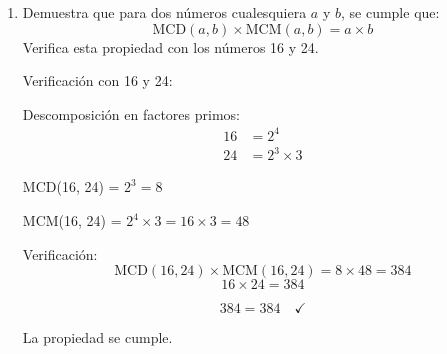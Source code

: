 \documentclass[12pt,a4paper]{article}
\begin{document}
\begin{enumerate}
Descomposición en factores primos:
\begin{align*}
120 &= 2^3 \times 3 \times 5 \\
180 &= 2^2 \times 3^2 \times 5 \\
240 &= 2^4 \times 3 \times 5
\end{align*}

MCD(120, 180, 240) = $2^2 \times 3 \times 5 = 4 \times 3 \times 5 = 60$ cm

Número de segmentos:
\begin{itemize}
    \item Del tubo de 120 cm: $120 \div 60 = 2$ segmentos
    \item Del tubo de 180 cm: $180 \div 60 = 3$ segmentos
    \item Del tubo de 240 cm: $240 \div 60 = 4$ segmentos
    \item Total: $2 + 3 + 4 = 9$ segmentos
\end{itemize}

Cada segmento debe medir  y se obtendrán  en total.
    
    \item Demuestra que para dos números cualesquiera $a$ y $b$, se cumple que: 
$$\text{MCD}(a,b) \times \text{MCM}(a,b) = a \times b$$
Verifica esta propiedad con los números 16 y 24.

Verificación con 16 y 24:

Descomposición en factores primos:
\begin{align*}
16 &= 2^4 \\
24 &= 2^3 \times 3
\end{align*}

MCD(16, 24) = $2^3 = 8$

MCM(16, 24) = $2^4 \times 3 = 16 \times 3 = 48$

Verificación:
$$\text{MCD}(16,24) \times \text{MCM}(16,24) = 8 \times 48 = 384$$
$$16 \times 24 = 384$$

$$\boxed{384 = 384} \quad \checkmark$$

La propiedad se cumple.
\end{enumerate}
\end{document}
